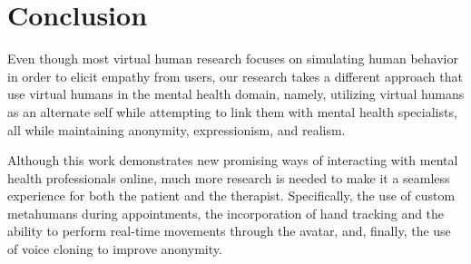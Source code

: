 \section{Conclusion}
Even though most virtual human research focuses on simulating human behavior in order to elicit empathy from users, our research takes a different approach that use virtual humans in the mental health domain, namely, utilizing virtual humans as an alternate self while attempting to link them with mental health specialists, all while maintaining anonymity, expressionism, and realism.

Although this work demonstrates new promising ways of interacting with mental health professionals online, much more research is needed to make it a seamless experience for both the patient and the therapist. Specifically, the use of custom metahumans during appointments, the incorporation of hand tracking and the ability to perform real-time movements through the avatar, and, finally, the use of voice cloning to improve anonymity.